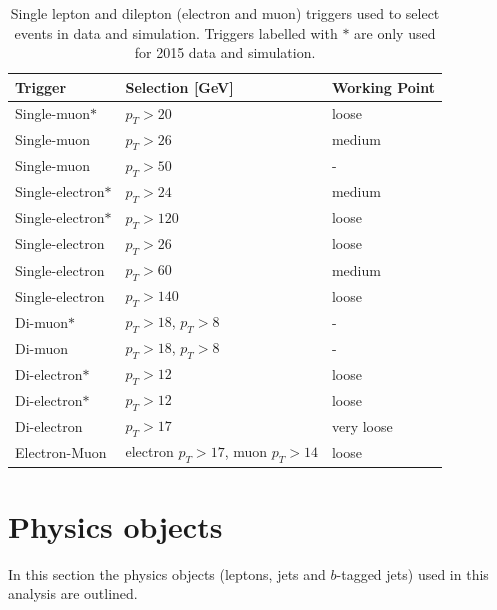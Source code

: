 \begin{table}[!htb]
\footnotesize
\def\arraystretch{1.3}
\begin{center}
\begin{tabular}{ l|l|l }
\hline
\hline
Trigger & Selection [GeV] & Working Point  \\ \hline
Single-muon$*$ & $p_{T} > 20$ & loose\\
Single-muon &  $p_{T} > 26$ & medium \\
Single-muon  &  $p_{T} > 50$ & - \\
Single-electron$*$  & $p_{T} > 24$ & medium \\
Single-electron$*$  & $p_{T} > 120$ & loose \\
Single-electron  & $p_{T} > 26$ & loose \\
Single-electron  & $p_{T} > 60$ & medium \\
Single-electron  & $p_{T} > 140$ & loose \\
Di-muon$*$  & $p_{T} > 18$, $p_{T} > 8$  & - \\
Di-muon  & $p_{T} > 18$, $p_{T} > 8$  & - \\
Di-electron$*$ & $p_{T} > 12$  & loose \\
Di-electron$*$ & $p_{T} > 12$  & loose \\
Di-electron & $p_{T} > 17$  & very loose \\
Electron-Muon & electron $p_{T}> 17$, muon $p_{T} > 14$ & loose\\

\hline
\hline
\end{tabular}
\caption{Single lepton and dilepton (electron and muon) triggers used to select events in data and simulation. Triggers labelled with $*$ are only used for 2015 data and simulation.}
\label{tab:triggers}
\end{center}
\end{table}
\section{Physics objects}
In this section the physics objects (leptons, jets and $b$-tagged jets) used in this analysis are outlined.
